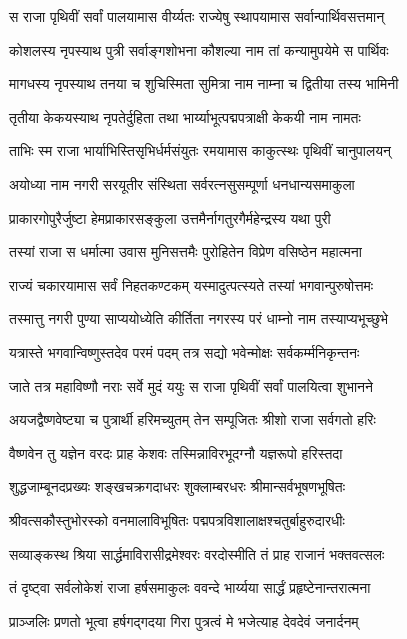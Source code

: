 \twolineshloka
{स राजा पृथिवीं सर्वां पालयामास वीर्य्यतः}
{राज्येषु स्थापयामास सर्वान्पार्थिवसत्तमान्}%

\twolineshloka
{कोशलस्य नृपस्याथ पुत्री सर्वाङ्गशोभना}
{कौशल्या नाम तां कन्यामुपयेमे स पार्थिवः}%

\twolineshloka
{मागधस्य नृपस्याथ तनया च शुचिस्मिता}
{सुमित्रा नाम नाम्ना च द्वितीया तस्य भामिनी}%

\twolineshloka
{तृतीया केकयस्याथ नृपतेर्दुहिता तथा}
{भार्य्याभूत्पद्मपत्राक्षी केकयी नाम नामतः}%

\twolineshloka
{ताभिः स्म राजा भार्याभिस्तिसृभिर्धर्मसंयुतः}
{रमयामास काकुत्स्थः पृथिवीं चानुपालयन्}%

\twolineshloka
{अयोध्या नाम नगरी सरयूतीर संस्थिता}
{सर्वरत्नसुसम्पूर्णा धनधान्यसमाकुला}%

\twolineshloka
{प्राकारगोपुरैर्जुष्टा हेमप्राकारसङ्कुला}
{उत्तमैर्नागतुरगैर्महेन्द्रस्य यथा पुरी}%

\twolineshloka
{तस्यां राजा स धर्मात्मा उवास मुनिसत्तमैः}
{पुरोहितेन विप्रेण वसिष्ठेन महात्मना}%

\twolineshloka
{राज्यं चकारयामास सर्वं निहतकण्टकम्}
{यस्मादुत्पत्स्यते तस्यां भगवान्पुरुषोत्तमः}%

\twolineshloka
{तस्मात्तु नगरी पुण्या साप्ययोध्येति कीर्तिता}
{नगरस्य परं धाम्नो नाम तस्याप्यभूच्छुभे}%

\twolineshloka
{यत्रास्ते भगवान्विष्णुस्तदेव परमं पदम्}
{तत्र सद्यो भवेन्मोक्षः सर्वकर्म्मनिकृन्तनः}%

\twolineshloka
{जाते तत्र महाविष्णौ नराः सर्वे मुदं ययुः}
{स राजा पृथिवीं सर्वां पालयित्वा शुभानने}%

\twolineshloka
{अयजद्वैष्णवेष्ट्या च पुत्रार्थी हरिमच्युतम्}
{तेन सम्पूजितः श्रीशो राजा सर्वगतो हरिः}%

\twolineshloka
{वैष्णवेन तु यज्ञेन वरदः प्राह केशवः}
{तस्मिन्नाविरभूदग्नौ यज्ञरूपो हरिस्तदा}%

\twolineshloka
{शुद्धजाम्बूनदप्रख्यः शङ्खचक्रगदाधरः}
{शुक्लाम्बरधरः श्रीमान्सर्वभूषणभूषितः}%

\twolineshloka
{श्रीवत्सकौस्तुभोरस्को वनमालाविभूषितः}
{पद्मपत्रविशालाक्षश्चतुर्बाहुरुदारधीः}%

\twolineshloka
{सव्याङ्कस्थ श्रिया सार्द्धमाविरासीद्रमेश्वरः}
{वरदोस्मीति तं प्राह राजानं भक्तवत्सलः}%

\twolineshloka
{तं दृष्ट्वा सर्वलोकेशं राजा हर्षसमाकुलः}
{ववन्दे भार्य्यया सार्द्धं प्रहृष्टेनान्तरात्मना}%

\twolineshloka
{प्राञ्जलिः प्रणतो भूत्वा हर्षगद्गदया गिरा}
{पुत्रत्वं मे भजेत्याह देवदेवं जनार्दनम्}%


